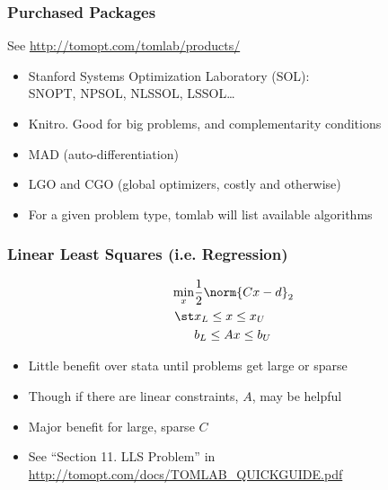 \documentclass[nofootline]{etk-presentation}
\begin{document}
\begin{frame}[fragile]	\frametitle{Purchased Packages}
	See \url{http://tomopt.com/tomlab/products/}
	\begin{itemize}
		\item Stanford 
		Systems Optimization Laboratory (SOL):\\SNOPT, NPSOL, NLSSOL, LSSOL\ldots
		\item Knitro.  Good for big problems, and complementarity conditions
		\item MAD (auto-differentiation)
		\item LGO and CGO (global optimizers, costly and otherwise)
		\item For a given problem type, tomlab will list available algorithms
	\end{itemize}
\end{frame}

\begin{frame}[fragile]	\frametitle{Linear Least Squares (i.e. Regression)}

	\begin{align*}
	\min_x &\frac{1}{2}\norm{C x - d}_2\\
	\st & x_L \leq x \leq x_U\\
	& b_L \leq A x \leq b_U
	\end{align*}
	
	\begin{itemize}
		\item Little benefit over stata until problems get large or sparse
		\item Though if there are linear constraints, $A$, may be helpful
		\item Major benefit for large, sparse $C$
		\item See ``Section 11. LLS Problem'' in \url{http://tomopt.com/docs/TOMLAB_QUICKGUIDE.pdf}
	\end{itemize}
\end{frame}
\end{document}
